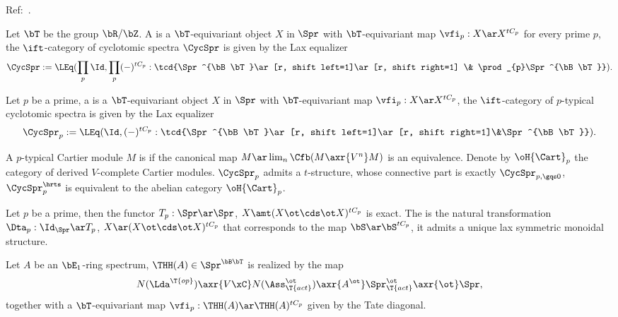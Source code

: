 \documentclass[article, a4paper, twoside]{universal}
\begin{document}
\confighead{}{}{}

Ref:~\cite{NS2018}.


\begin{dfn}
    Let $\bT$ be the group $\bR/\bZ$. A  is a $\bT$-equivariant object $X$ in $\Spr$ with $\bT$-equivariant map $\vfi_{p}:X\ar X^{tC_{p}}$ for every prime $p$, the $\ift$-category of cyclotomic spectra $\CycSpr$ is given by the Lax equalizer
    \[
        \CycSpr:=\LEq(\prod_{p}\Id,\prod_{p}(-)^{tC_{p}}:\tcd{\Spr^{\bB\bT}\ar[r, shift left=1]\ar[r, shift right=1] \& \prod_{p}\Spr^{\bB\bT}}).
    \]
\end{dfn}

\begin{dfn}[{\cite[2.1]{AN2021}}]
    Let $p$ be a prime, a  is a $\bT$-equivariant object $X$ in $\Spr$ with $\bT$-equivariant map $\vfi_{p}:X\ar X^{tC_{p}}$, the $\ift$-category of $p$-typical cyclotomic spectra is given by the Lax equalizer
    \[
        \CycSpr_{p}:=\LEq(\Id,(-)^{tC_{p}}:\tcd{\Spr^{\bB\bT}\ar[r, shift left=1]\ar[r, shift right=1]\&\Spr^{\bB\bT}}).
    \]
\end{dfn}

\begin{thm}[{\cite[3.24, 3.26]{AN2021}}]
    A $p$-typical Cartier module $M$ is  if the canonical map $M\ar\lim_{n}\Cfb(M\axr{V^{n}}M)$ is an equivalence. Denote by $\oH{\Cart}_{p}$ the category of derived $V$-complete Cartier modules. $\CycSpr_{p}$ admits a $t$-structure, whose connective part is exactly $\CycSpr_{p,\gqs0}$, $\CycSpr_{p}^{\hrts}$ is equivalent to the abelian category $\oH{\Cart}_{p}$.
\end{thm}

\begin{thm}
    Let $p$ be a prime, then the functor $T_{p}:\Spr\ar\Spr$, $X\amt (X\ot\cds\ot X)^{tC_{p}}$ is exact. The  is the natural transformation $\Dta_{p}:\Id_{\Spr}\ar T_{p}$, $X\ar(X\ot\cds\ot X)^{tC_{p}}$ that corresponds to the map $\bS\ar\bS^{tC_{p}}$, it admits a unique lax symmetric monoidal structure.
\end{thm}

\begin{dfn}[{\cite[B.5, \Rnum{3}.2.3]{NS2018}}]
    Let $A$ be an $\bE_{1}$-ring spectrum, $\THH(A)\in\Spr^{\bB\bT}$ is realized by the map
    \[
        N(\Lda^{\T{op}})\axr{V\xC}N(\Ass_{\T{act}}^{\ot})\axr{A^{\ot}}\Spr_{\T{act}}^{\ot}\axr{\ot}\Spr,
    \]
    together with a $\bT$-equivariant map $\vfi_{p}:\THH(A)\ar\THH(A)^{tC_{p}}$ given by the Tate diagonal.
\end{dfn}
\end{document}
